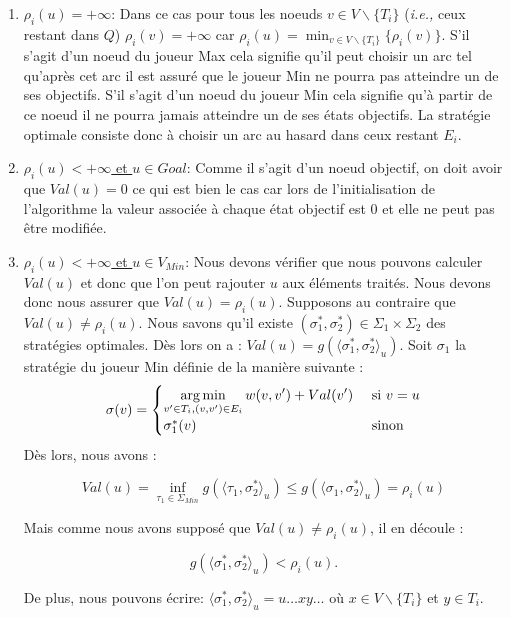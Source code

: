 \begin{enumerate}
	\item \underline{$\rho_i(u) = +\infty$}: Dans ce cas pour tous les noeuds $v \in V\backslash \{ T_i \}$ (\emph{i.e.,} ceux restant dans $Q$) $\rho_i(v) = + \infty$ car $\rho_i(u) = \min _{v \in V\backslash \{ T_i \}} \{\rho_i(v)\}$. S'il s'agit d'un noeud du joueur Max cela signifie qu'il peut choisir un arc tel qu'après cet arc il est assuré que le joueur Min ne pourra pas atteindre un de ses objectifs. S'il s'agit d'un noeud du joueur Min cela signifie qu'à partir de ce noeud il ne pourra jamais atteindre un de ses états objectifs. La stratégie optimale consiste donc à choisir un arc au hasard dans ceux restant $E_i$.
	\item\underline{$\rho_i(u) < +\infty$ et $u \in Goal$}: Comme il s'agit d'un noeud objectif, on doit avoir que $Val(u) = 0$ ce qui est bien le cas car lors de l'initialisation de l'algorithme la valeur associée à chaque état objectif est 0 et elle ne peut pas être modifiée.
	\item\underline{$\rho_i(u) < +\infty$ et $u \in V_{Min}$}: Nous devons vérifier que nous pouvons calculer $Val(u)$ et donc que l'on peut rajouter $u$ aux éléments traités. Nous devons donc nous assurer que $Val(u) = \rho_i(u)$.
	Supposons au contraire que $Val(u) \neq \rho_i(u)$. Nous savons qu'il existe $(\sigma_1^*,\sigma_2^*) \in \Sigma_1 \times \Sigma_2 $ des stratégies optimales. Dès lors on a : $Val(u) = g(\langle \sigma_1^*, \sigma_2^* \rangle_u)$. Soit $\sigma_1$ la stratégie du joueur Min définie de la manière suivante : $$  \sigma(v) = \begin{cases}
											\displaystyle	\operatorname*{arg\,min}_{v'\in T_i,(v,v')\in E_i} w(v,v') + Val(v') & \text{ si } v = u\\
												\sigma_1^*(v) &\text{ sinon} \end{cases}$$
Dès lors, nous avons : 

$$ Val(u) = \inf_{\tau_1 \in \Sigma_{Min}} g(\langle \tau_1 , \sigma_2^* \rangle_u) \leq g(\langle \sigma_1, \sigma_2^* \rangle_u) = \rho_i(u) $$

Mais comme nous avons supposé que $Val(u) \neq \rho_i(u)$, il en découle : 

\begin{equation} g(\langle \sigma_1^*, \sigma_2^* \rangle_u) < \rho_i(u).\label{eq:dijk3}\end{equation}

De plus, nous pouvons écrire: $\langle \sigma_1^*, \sigma_2^* \rangle_u = u \ldots xy \ldots$ où $x \in V\backslash \{ T_i \}$ et $y \in T_i$.


\end{enumerate}

